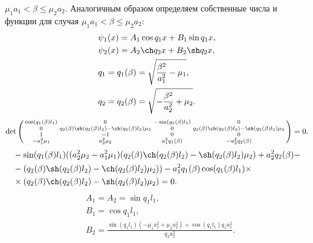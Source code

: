 \documentclass[12pt, a4paper]{article}
\begin{document}
 $ \mu_1a_1 < \beta \le \mu_2a_2 $. Аналогичным образом определяем собственные числа и функции для случая $ \mu_1a_1 < \beta \le \mu_2a_2 $:
\begin{equation}
  \begin{aligned}
    & \psi_1(x) = A_1 \cos q_1x + B_1 \sin q_1x, \\
    & \psi_2(x) = A_2 \ch q_2x + B_2 \sh q_2x, \\
    & q_1 = q_1(\beta) = \sqrt{\frac{\beta^2}{a_1^2} - \mu_1}, \\
    & q_2 = q_2(\beta) = \sqrt{- \frac{\beta^2}{a_2^2} + \mu_2}.
  \end{aligned}
  \label{eq:6}
\end{equation}
\begin{equation}
  \det \left(  
  \begin{smallmatrix}
    \cos(q_1(\beta) l_1) & 0 & -\sin(q_1(\beta) l_1) & 0 \\
    0 & q_2(\beta) \sh(q_2(\beta) l_2)-\ch(q_2(\beta) l_2) \mu_2 & 0 & q_2(\beta) \ch(q_2(\beta) l_2)-\sh(q_2(\beta) l_2) \mu_2 \\
    1 & -1 & 0 & 0 \\
    -a_1^2 \mu_1 & a_2^2 \mu_2 & a_1^2 q_1(\beta) & -a_2^2 q_2(\beta) \\
  \end{smallmatrix}
  \right) = 0.
\end{equation}
\begin{equation}
  \begin{aligned}
  & -\sin(q_1(\beta) l_1) ((a_2^2 \mu_2-a_1^2 \mu_1) (q_2(\beta) \ch(q_2(\beta) l_2)-\sh(q_2(\beta) l_2) \mu_2)+a_2^2 q_2(\beta)- \\
  & -(q_2(\beta) \sh(q_2(\beta) l_2)-\ch(q_2(\beta) l_2) \mu_2))-a_1^2 q_1(\beta) \cos(q_1(\beta) l_1) \times \\
  & \times (q_2(\beta) \ch(q_2(\beta) l_2)-\sh(q_2(\beta) l_2) \mu_2) = 0.
  \end{aligned}
\end{equation}
\begin{equation}
  \begin{aligned}
    & A_1 = A_2 = \sin q_1l_1, \\
    & B_1 = \cos q_1l_1, \\
    & B_2 = \frac{\sin (q_1l_1) (-\mu_1 a_1^2 + \mu_2 a_2^2) + \cos (q_1l_1) q_1 a_1^2}{q_2a_2^2}.
  \end{aligned}
\end{equation}
\end{document}
